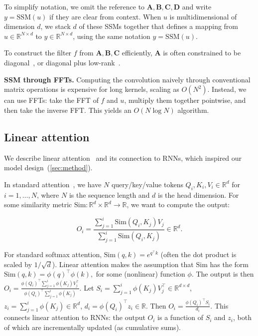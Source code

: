 To simplify notation, we omit the reference to $\mathbf{A}, \mathbf{B}, \mathbf{C}, \mathbf{D}$ and write $y = \mathrm{SSM}(u)$ if they are clear from context. When $u$ is multidimensional of dimension $d$, we stack $d$ of these SSMs together that defines a mapping from $u \in \mathbb{R}^{N \times d}$ to $y \in \mathbb{R}^{N \times d}$, using the same notation $y = \mathrm{SSM}(u)$.

To construct the filter $f$ from $\mathbf{A}, \mathbf{B}, \mathbf{C}$ efficiently, $\mathbf{A}$ is often constrained to be diagonal~\citep{gupta2022diagonal,gu2022parameterization}, or diagonal plus low-rank~\citep{gu2022efficiently}.

\textbf{SSM through FFTs.} Computing the convolution naively through conventional matrix operations is expensive for long kernels, scaling as $O(N^2)$. Instead, we can use FFTs: take the FFT of $f$ and $u$, multiply them together pointwise, and then take the inverse FFT. This yields an $O(N \log N)$ algorithm.

\subsection{Linear attention}

We describe linear attention~\citep{katharopoulos2020transformers} and its connection to RNNs, which inspired our model design~(\ref{sec:method}).

In standard attention~\citep{vaswani2017attention}, we have $N$ query/key/value tokens $Q_i, K_i, V_i \in \mathbb{R}^d$ for $i = 1, \dots, N$, where $N$ is the sequence length and $d$ is the head dimension. For some similarity metric $\mathrm{Sim} \colon \mathbb{R}^d \times \mathbb{R}^d \to \mathbb{R}$, we want to compute the output:

\begin{equation*}
  O_i = \frac{\sum_{j=1}^i\mathrm{Sim}(Q_i, K_j) V_j}{\sum_{j=1}^i \mathrm{Sim}(Q_i, K_j)} \in \mathbb{R}^d.
\end{equation*}

For standard softmax attention, $\mathrm{Sim}(q, k) = e^{q^\top k}$ (often the dot product is scaled by $1/\sqrt{d}$).
Linear attention makes the assumption that $\mathrm{Sim}$ has the form
$\mathrm{Sim}(q, k) = \phi(q)^\top \phi(k),$
for some (nonlinear) function $\phi$.
The output is then $O_i = \frac{\phi(Q_i)^\top \sum_{j=1}^{i} \phi(K_j) V_j^\top }{\phi(Q_i)^\top \sum_{j=1}^{i} \phi(K_j)}$.
Let
$S_i = \sum_{j=1}^{i} \phi(K_j) V_j^\top \in \mathbb{R}^{d \times d}$, $z_i = \sum_{j=1}^{i} \phi(K_j) \in \mathbb{R}^d$, $d_i = \phi(Q_{i})^\top z_i \in \mathbb{R}$.
Then $O_i = \frac{\phi(Q_i)^\top S_i}{d_i}$. This connects linear attention to RNNs: the output $O_i$ is a function of $S_i$ and $z_i$, both of which are incrementally updated (as cumulative sums).

